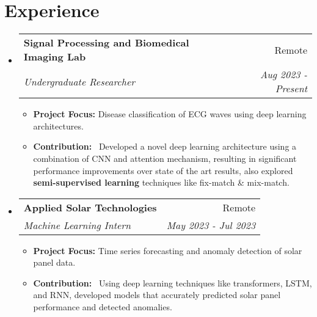 \documentclass[a4paper,20pt]{article}
\makeatletter
\newcommand{\resumeSubheading}[4]{
  \vspace{-1pt}\item
    \begin{tabular*}{0.97\textwidth}{l@{\extracolsep{\fill}}r}
      \textbf{#1} & #2 \\
      \textit{#3} & \textit{#4} \\
    \end{tabular*}\vspace{-5pt}
}
\newcommand{\resumeSubHeadingListStart}{\begin{itemize}[leftmargin=*]}
\newcommand{\resumeSubHeadingListEnd}{\end{itemize}}
\makeatother
\begin{document}
\vspace{3pt}
\section{Experience}
  \resumeSubHeadingListStart
    \resumeSubheading{Signal Processing and Biomedical Imaging Lab}{Remote}
        {Undergraduate Researcher}{Aug 2023 - Present}
    \begin{itemize}
    \item {\textbf{Project Focus: }Disease classification of ECG waves using deep learning architectures.}
    \item {\textbf{Contribution: }~Developed a novel deep learning architecture using a combination of CNN and attention mechanism, resulting in significant performance improvements over state of the art results, also explored \textbf{semi-supervised learning} techniques like fix-match \& mix-match.}
    \end{itemize}

\vspace{-5pt}
    \resumeSubheading{Applied Solar Technologies}{Remote}
    {Machine Learning Intern}{May 2023 - Jul 2023}
    \begin{itemize}
    \item {\textbf{Project Focus: }Time series forecasting and anomaly detection of solar panel data.}
    \item {\textbf{Contribution: }~Using deep learning techniques like transformers, LSTM, and RNN, developed models that accurately predicted solar panel performance and detected anomalies.}
    \end{itemize}

\resumeSubHeadingListEnd

\vspace{3pt}
\end{document}
